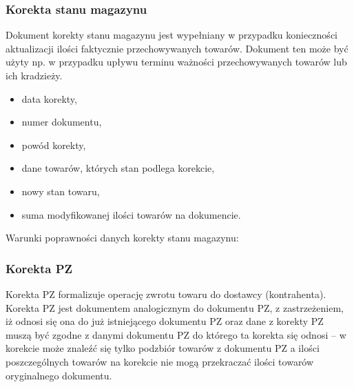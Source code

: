 \subsubsection{Korekta stanu magazynu}
Dokument korekty stanu magazynu jest wypełniany w przypadku
konieczności aktualizacji ilości faktycznie przechowywanych towarów.
Dokument ten może być użyty np. w przypadku upływu terminu ważności
przechowywanych towarów lub ich kradzieży.
\begin{itemize}
\item data korekty,
\item numer dokumentu,
\item powód korekty,
\item dane towarów, których stan podlega korekcie,
\item nowy stan towaru,
\item suma modyfikowanej ilości towarów na dokumencie.
\end{itemize}

Warunki poprawności danych korekty stanu magazynu:

\subsubsection{Korekta PZ}
Korekta PZ formalizuje operację zwrotu towaru do dostawcy
(kontrahenta).  Korekta PZ jest dokumentem analogicznym do dokumentu
PZ, z zastrzeżeniem, iż odnosi się ona do już istniejącego dokumentu
PZ oraz dane z korekty PZ muszą być zgodne z danymi dokumentu PZ do
którego ta korekta się odnosi -- w korekcie może znaleźć się tylko
podzbiór towarów z dokumentu PZ a ilości poszczególnych towarów na
korekcie nie mogą przekraczać ilości towarów oryginalnego dokumentu.

